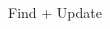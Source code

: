 \documentclass[t]{beamer}
\theoremstyle{plain}
\begin{document}
\begin{frame}{Find + Update}
\begin{columns}
\begin{column}{.35\textwidth}
{            %
        }
    \end{column}
    \end{columns}
\end{frame}
\end{document}

